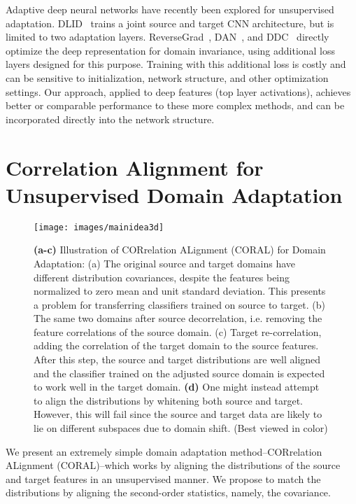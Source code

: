 \documentclass[letterpaper]{article}
\begin{document}
Adaptive deep neural networks have recently been explored for unsupervised adaptation. DLID~\cite{chopra2013dlid} trains a joint source and target CNN architecture, but is limited to two adaptation layers. ReverseGrad~\cite{reversegrad}, DAN~\cite{dan_long15}, and DDC~\cite{tzeng_arxiv15} directly optimize the deep representation for domain invariance, using additional loss layers designed for this purpose. Training with this additional loss is costly and can be sensitive to initialization, network structure, and other optimization settings. Our approach, applied to deep features (top layer activations), achieves better or comparable performance to these more complex methods, and can be incorporated directly into the network structure.
\section{Correlation Alignment for Unsupervised Domain Adaptation}
\label{sec:methods}

\begin{figure}[t]
\centering
\texttt{[image: images/mainidea3d]}
\vspace{-0.3in}
\caption{\small \textbf{(a-c)} Illustration of CORrelation ALignment (CORAL) for Domain Adaptation: (a) The original source and target domains have different distribution covariances, despite the features being normalized to zero mean and unit standard deviation. This presents a problem for transferring classifiers trained on source to target. (b) The same two domains after source decorrelation, i.e. removing the feature correlations of the source domain. (c) Target re-correlation, adding the correlation of the target domain to the source features. After this step, the source and target distributions are well aligned and the classifier trained on the adjusted source domain is expected to work well in the target domain. \textbf{(d)} One might instead attempt to align the distributions by whitening both source and target. However, this will fail since the source and target data are likely to lie on different subspaces due to domain shift. (Best viewed in color)}
\label{fig:variance}
\vspace{-0.2in}
\end{figure}

We present an extremely simple domain adaptation method--CORrelation ALignment (CORAL)--which works by aligning the distributions of the source and target features in an unsupervised manner. 
We propose to match the distributions by aligning the second-order statistics, namely, the covariance. 
\end{document}
